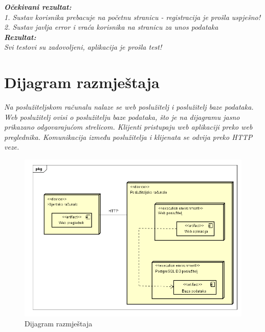               \textbf{\textit{Očekivani rezultat:}}\\
 
              \textit{1. Sustav korisnika prebacuje na početnu stranicu - registracija je prošla uspješno!}\\
              \textit{2. Sustav javlja error i vraća korisnika na stranicu za unos podataka}\\
 
              \textbf{\textit{Rezultat:}}\\
              \textit{Svi testovi su zadovoljeni, aplikacija je prošla test!}\\
			 
			
			\eject 
		
		
		\section{Dijagram razmještaja}
			
			
			 \textit{Na poslužiteljskom računalu nalaze se web poslužitelj i poslužitelj baze podataka. Web poslužitelj ovisi o poslužitelju baze podataka, što je na dijagramu jasno prikazano odgovarajućom strelicom. Klijenti pristupaju web aplikaciji preko web preglednika. Komunikacija između poslužitelja i klijenata se odvija preko HTTP veze.}
			
			 \begin{figure}[H]
				\includegraphics[scale=0.7]{slike/Dijagram_Razmjestaja.png} %
				\centering
				\caption{Dijagram razmještaja}
				\label{fig:razmjestaj}
			\end{figure}


